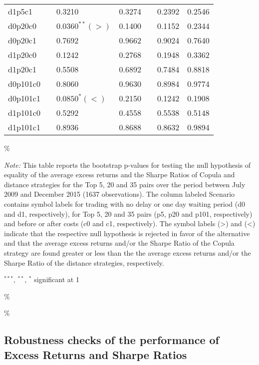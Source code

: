 \documentclass[a4paper]{article}
\begin{document}
\begin{threeparttable}[H]
\begin{tabularx}{\textwidth}{@{\extracolsep{\fill}}lllllll@{}}
		d1p5c1 & & 0.3210 & 0.3274 &       & 0.2392 & 0.2546 \\
		d0p20c0 & & $0.0360^{**}(>)$ & 0.1400 &       & 0.1152 & 0.2344 \\
		d0p20c1 & & 0.7692 & 0.9662 &       & 0.9024 & 0.7640 \\
		d1p20c0 & & 0.1242 & 0.2768 &       & 0.1948 & 0.3362 \\
		d1p20c1 & & 0.5508 & 0.6892 &       & 0.7484 & 0.8818 \\
		d0p101c0 & & 0.8060 & 0.9630 &       & 0.8984 & 0.9774 \\
		d0p101c1 & & $0.0850^{*}(<)$ & 0.2150 &       & 0.1242 & 0.1908 \\
		d1p101c0 & & 0.5292 & 0.4558 &       & 0.5538 & 0.5148 \\
		d1p101c1 & & 0.8936 & 0.8688 &       & 0.8632 & 0.9894 \\
		\bottomrule
	\end{tabularx}\%
	\begin{tablenotes}
		\item \textit{Note:} \scriptsize This table reports the bootstrap p-values for testing the null hypothesis of equality of the average excess returns and the Sharpe Ratios of Copula and distance strategies for the Top 5, 20 and 35 pairs over the period between July 2009 and December 2015 (1637 observations). The column labeled Scenario contains symbol labels for trading with no delay or one day waiting period (d0 and d1, respectively), for Top 5, 20 and 35 pairs (p5, p20 and p101, respectively) and before or after costs (c0 and c1, respectively). The symbol labels (>) and (<) indicate that the respective null hypothesis is rejected in favor of the alternative and that the average excess returns and/or the Sharpe Ratio of the Copula strategy are found greater or less than the the average excess returns and/or the Sharpe Ratio of the distance strategies, respectively.
		\item \scriptsize $^{\ast\ast\ast}$, $^{\ast\ast}$, $^{\ast}$  significant at 1\\%
	\end{tablenotes}
	\label{tab:table125}\%
\end{threeparttable}\%
	
\vspace{1.0cm}
	
	\subsection{Robustness checks of the performance of Excess Returns and Sharpe Ratios}
	
\end{document}
